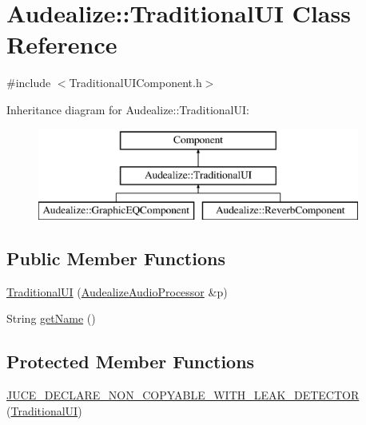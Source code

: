 \hypertarget{class_audealize_1_1_traditional_u_i}{}\section{Audealize\+:\+:Traditional\+UI Class Reference}
\label{class_audealize_1_1_traditional_u_i}


{\ttfamily \#include $<$Traditional\+U\+I\+Component.\+h$>$}

Inheritance diagram for Audealize\+:\+:Traditional\+UI\+:\begin{figure}[H]
\begin{center}
\leavevmode
\includegraphics[height=3.000000cm]{class_audealize_1_1_traditional_u_i}
\end{center}
\end{figure}
\subsection*{Public Member Functions}
\begin{DoxyCompactItemize}
\item 
\hyperlink{class_audealize_1_1_traditional_u_i_aee7020626c7d568300b7a4d92a032953}{Traditional\+UI} (\hyperlink{class_audealize_1_1_audealize_audio_processor}{Audealize\+Audio\+Processor} \&p)
\item 
String \hyperlink{class_audealize_1_1_traditional_u_i_a0447dab44d7e62f4382f368b4e3f8bec}{get\+Name} ()
\end{DoxyCompactItemize}
\subsection*{Protected Member Functions}
\begin{DoxyCompactItemize}
\item 
\hyperlink{class_audealize_1_1_traditional_u_i_a4826276319a81e9867e09ccb37320e54}{J\+U\+C\+E\+\_\+\+D\+E\+C\+L\+A\+R\+E\+\_\+\+N\+O\+N\+\_\+\+C\+O\+P\+Y\+A\+B\+L\+E\+\_\+\+W\+I\+T\+H\+\_\+\+L\+E\+A\+K\+\_\+\+D\+E\+T\+E\+C\+T\+OR} (\hyperlink{class_audealize_1_1_traditional_u_i}{Traditional\+UI})
\end{DoxyCompactItemize}
